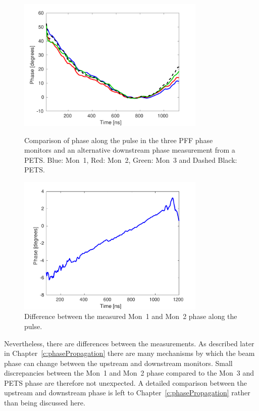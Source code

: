 \begin{figure}
  \centering
  \includegraphics[width=0.8\textwidth]{Figures/phaseMons/phaseAlongAll}
  \caption{Comparison of phase along the pulse in the three PFF phase monitors and an alternative downstream phase measurement from a PETS. Blue: Mon~1, Red: Mon~2, Green: Mon~3 and Dashed Black: PETS.}
  \label{f:phaseAlongAll}
  \includegraphics[width=0.8\textwidth]{Figures/phaseMons/DiffMon1Mon2Along}
  \caption{Difference between the measured Mon~1 and Mon~2 phase along the pulse.}
  \label{f:DiffMon1Mon2Along}
\end{figure}

Nevertheless, there are differences between the measurements. As described later in Chapter~\ref{c:phasePropagation} there are many mechanisms by which the beam phase can change between the upstream and downstream monitors. Small discrepancies between the Mon~1 and Mon~2 phase compared to the Mon~3 and PETS phase are therefore not unexpected. A detailed comparison between the upstream and downstream phase is left to Chapter~\ref{c:phasePropagation} rather than being discussed here. 

